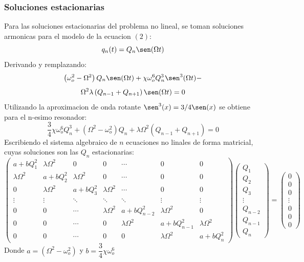 \documentclass[11pt,letterpaper,twocolumn]{article}
\begin{document}
\subsubsection*{Soluciones estacionarias}
Para las soluciones estacionarias del problema no lineal, se toman soluciones armonicas para el modelo de la ecuacion $(2)$: 
$$q_{n}(t)=Q_{n} \sen(\Omega t)$$
Derivando y remplazando: 
$$\left( \omega_{o}^{2} - \Omega^{2} \right) Q_{n} \sen(\Omega t) + \chi \omega_{o}^{6} Q_{n}^{3} \sen^{3}(\Omega t)-$$ 
$$ \Omega^{2} \lambda \left( Q_{n-1} + Q_{n+1} \right) \sen(\Omega t)=0 $$
Utilizando la aproximacion de onda rotante $\sen^{3}(x)=3/4 \sen(x)$ se obtiene para el n-esimo resonador: 
$$\dfrac{3}{4}\chi\omega_{o}^{6}Q_{n}^{3} + \left( \Omega^{2}-\omega_{o}^{2} \right) Q_{n} + \lambda \Omega^{2} \left( Q_{n-1} + Q_{n+1} \right) =0$$
Escribiendo el sistema algebraico de $n$ ecuaciones no linales de forma matricial, cuyas soluciones son las $Q_{n}$ estacionarias: 
{\fontsize{3}{15}\selectfont
\begin{equation}
\left(
\begin{matrix}
a+bQ_{1}^{2} & \lambda \Omega^{2} & 0 & 0 & \cdots & 0 & 0 \\
\lambda \Omega^{2} & a+bQ_{2}^{2} &  \lambda\Omega^{2} & 0 & \cdots & 0 & 0\\
0 & \lambda \Omega^{2} & a+bQ_{3}^{2} & \lambda \Omega^{2}  & \cdots & 0& 0 \\

\vdots & \vdots & \ddots & \ddots & \ddots & \vdots & \vdots \\
0 & 0 & \cdots & \lambda \Omega^{2} &  a+bQ_{n-2}^{2} & \lambda \Omega^{2} &0\\    
0 & 0 & \cdots & 0 & \lambda \Omega^{2} & a+bQ_{n-1}^{2} & \lambda \Omega^{2}\\    
0 & 0 & \cdots & 0 & 0 & \lambda \Omega^{2}  & a+bQ_{n}^{2}     
\end{matrix} \right) \left(
\begin{matrix}
Q_{1}\\
Q_{2}\\
Q_{3}\\
\vdots\\
Q_{n-2}\\
Q_{n-1}\\
Q_{n}
\end{matrix} \right)= \left(
\begin{matrix}
0\\
0\\
0\\
\vdots\\
0\\
0\\
0
\end{matrix} \right)
\end{equation}
} 
Donde $a=\left( \Omega^{2}-\omega_{o}^{2} \right)$ y $b=\dfrac{3}{4}\chi\omega_{o}^{6}$
\end{document}
